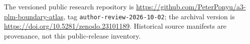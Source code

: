 The versioned public research repository is
\url{https://github.com/PeterPonyu/a3-plm-boundary-atlas},
tag \texttt{author-review-2026-10-02}; the archival version is
\url{https://doi.org/10.5281/zenodo.23101189}.
Historical source manifests are provenance, not this public-release inventory.
